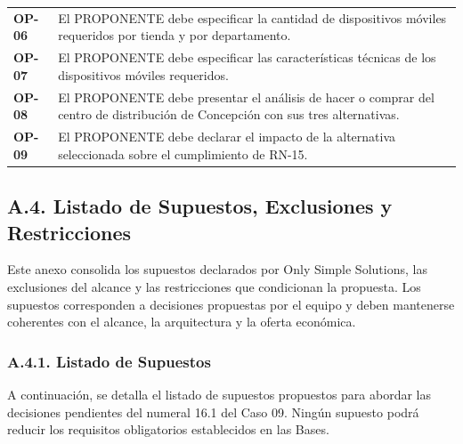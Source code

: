 \documentclass[11pt]{article}
\begin{document}
\begin{longtable}[]{@{}
  >{\raggedright\arraybackslash}p{}
  >{\raggedright\arraybackslash}p{}@{}}
\addlinespace[2pt]
\textbf{OP-06} & El PROPONENTE debe especificar la cantidad de dispositivos móviles requeridos por tienda y por departamento. \\
\addlinespace[2pt]
\textbf{OP-07} & El PROPONENTE debe especificar las características técnicas de los dispositivos móviles requeridos. \\
\addlinespace[2pt]
\textbf{OP-08} & El PROPONENTE debe presentar el análisis de hacer o comprar del centro de distribución de Concepción con sus tres alternativas. \\
\addlinespace[2pt]
\textbf{OP-09} & El PROPONENTE debe declarar el impacto de la alternativa seleccionada sobre el cumplimiento de RN-15. \\
\end{longtable}

\subsection{A.4. Listado de Supuestos, Exclusiones y Restricciones}\label{a-4-listado-de-supuestos-exclusiones-y-restricciones}

Este anexo consolida los supuestos declarados por Only Simple Solutions, las exclusiones del alcance y las restricciones que condicionan la propuesta. Los supuestos corresponden a decisiones propuestas por el equipo y deben mantenerse coherentes con el alcance, la arquitectura y la oferta económica.

\subsubsection{A.4.1. Listado de Supuestos}\label{a-4-1-listado-de-supuestos}

A continuación, se detalla el listado de supuestos propuestos para abordar las decisiones pendientes del numeral 16.1 del Caso 09. Ningún supuesto podrá reducir los requisitos obligatorios establecidos en las Bases.
\end{document}
